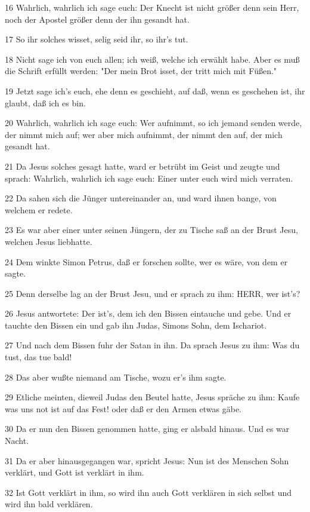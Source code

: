 \par 16 Wahrlich, wahrlich ich sage euch: Der Knecht ist nicht größer denn sein Herr, noch der Apostel größer denn der ihn gesandt hat.
\par 17 So ihr solches wisset, selig seid ihr, so ihr's tut.
\par 18 Nicht sage ich von euch allen; ich weiß, welche ich erwählt habe. Aber es muß die Schrift erfüllt werden: "Der mein Brot isset, der tritt mich mit Füßen."
\par 19 Jetzt sage ich's euch, ehe denn es geschieht, auf daß, wenn es geschehen ist, ihr glaubt, daß ich es bin.
\par 20 Wahrlich, wahrlich ich sage euch: Wer aufnimmt, so ich jemand senden werde, der nimmt mich auf; wer aber mich aufnimmt, der nimmt den auf, der mich gesandt hat.
\par 21 Da Jesus solches gesagt hatte, ward er betrübt im Geist und zeugte und sprach: Wahrlich, wahrlich ich sage euch: Einer unter euch wird mich verraten.
\par 22 Da sahen sich die Jünger untereinander an, und ward ihnen bange, von welchem er redete.
\par 23 Es war aber einer unter seinen Jüngern, der zu Tische saß an der Brust Jesu, welchen Jesus liebhatte.
\par 24 Dem winkte Simon Petrus, daß er forschen sollte, wer es wäre, von dem er sagte.
\par 25 Denn derselbe lag an der Brust Jesu, und er sprach zu ihm: HERR, wer ist's?
\par 26 Jesus antwortete: Der ist's, dem ich den Bissen eintauche und gebe. Und er tauchte den Bissen ein und gab ihn Judas, Simons Sohn, dem Ischariot.
\par 27 Und nach dem Bissen fuhr der Satan in ihn. Da sprach Jesus zu ihm: Was du tust, das tue bald!
\par 28 Das aber wußte niemand am Tische, wozu er's ihm sagte.
\par 29 Etliche meinten, dieweil Judas den Beutel hatte, Jesus spräche zu ihm: Kaufe was uns not ist auf das Fest! oder daß er den Armen etwas gäbe.
\par 30 Da er nun den Bissen genommen hatte, ging er alsbald hinaus. Und es war Nacht.
\par 31 Da er aber hinausgegangen war, spricht Jesus: Nun ist des Menschen Sohn verklärt, und Gott ist verklärt in ihm.
\par 32 Ist Gott verklärt in ihm, so wird ihn auch Gott verklären in sich selbst und wird ihn bald verklären.
